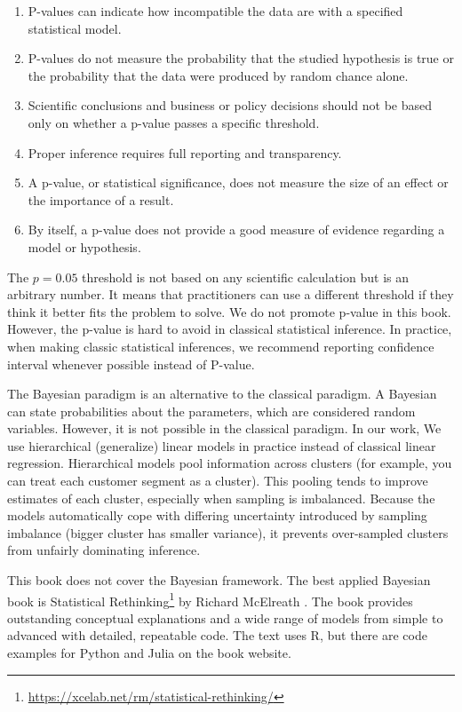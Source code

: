 \documentclass[12pt,]{krantz}
\providecommand{\tightlist}{%
  \setlength{\itemsep}{0pt}\setlength{\parskip}{0pt}}
\renewcommand{\href}[2]{#2\footnote{\url{#1}}}
\begin{document}
\begin{enumerate}
\def\labelenumi{\arabic{enumi}.}
\tightlist
\item
  P-values can indicate how incompatible the data are with a specified statistical model.
\item
  P-values do not measure the probability that the studied hypothesis is true or the probability that the data were produced by random chance alone.
\item
  Scientific conclusions and business or policy decisions should not be based only on whether a p-value passes a specific threshold.
\item
  Proper inference requires full reporting and transparency.
\item
  A p-value, or statistical significance, does not measure the size of an effect or the importance of a result.
\item
  By itself, a p-value does not provide a good measure of evidence regarding a model or hypothesis.
\end{enumerate}

The \(p = 0.05\) threshold is not based on any scientific calculation but is an arbitrary number. It means that practitioners can use a different threshold if they think it better fits the problem to solve. We do not promote p-value in this book. However, the p-value is hard to avoid in classical statistical inference. In practice, when making classic statistical inferences, we recommend reporting confidence interval whenever possible instead of P-value.

The Bayesian paradigm is an alternative to the classical paradigm. A Bayesian can state probabilities about the parameters, which are considered random variables. However, it is not possible in the classical paradigm. In our work, We use hierarchical (generalize) linear models in practice instead of classical linear regression. Hierarchical models pool information across clusters (for example, you can treat each customer segment as a cluster). This pooling tends to improve estimates of each cluster, especially when sampling is imbalanced. Because the models automatically cope with differing uncertainty introduced by sampling imbalance (bigger cluster has smaller variance), it prevents over-sampled clusters from unfairly dominating inference.

This book does not cover the Bayesian framework. The best applied Bayesian book is \href{https://xcelab.net/rm/statistical-rethinking/}{Statistical Rethinking} by Richard McElreath \citep{rethinking2020}. The book provides outstanding conceptual explanations and a wide range of models from simple to advanced with detailed, repeatable code. The text uses R, but there are code examples for Python and Julia on the book website.
\end{document}
